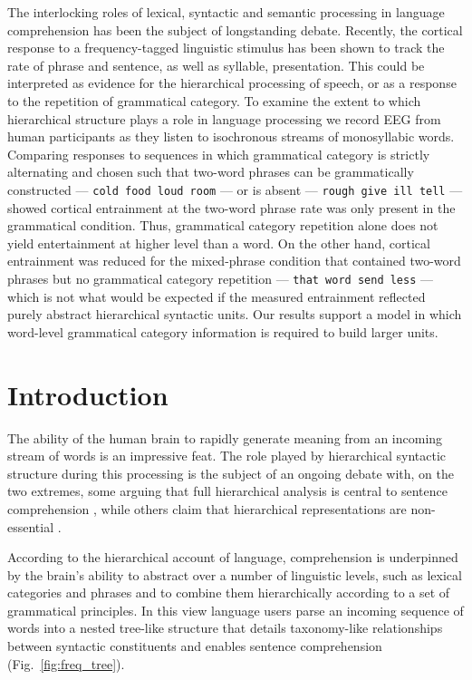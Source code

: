 \documentclass[10pt,letterpaper]{article}
\newcommand{\citet}[1]{\cite{#1}}
\begin{document}
The interlocking roles of lexical, syntactic and semantic processing
in language comprehension has been the subject of longstanding
debate. Recently, the cortical response to a frequency-tagged
linguistic stimulus has been shown to track the rate of phrase and
sentence, as well as syllable, presentation. This could be interpreted
as evidence for the hierarchical processing of speech, or as a
response to the repetition of grammatical category. To examine the
extent to which hierarchical structure plays a role in language
processing we record EEG from human participants as they listen to
isochronous streams of monosyllabic words. Comparing responses to
sequences in which grammatical category is strictly alternating and
chosen such that two-word phrases can be grammatically constructed ---
\texttt{cold food loud room} --- or is absent --- \texttt{rough give
  ill tell} --- showed cortical entrainment at the two-word phrase
rate was only present in the grammatical condition. Thus, grammatical
category repetition alone does not yield entertainment at higher level
than a word. On the other hand, cortical entrainment was reduced for
the mixed-phrase condition that contained two-word phrases but no
grammatical category repetition --- \texttt{that word send less} ---
which is not what would be expected if the measured entrainment
reflected purely abstract hierarchical syntactic units. Our results
support a model in which word-level grammatical category information
is required to build larger units.

\section*{Introduction}

The ability of the human brain to rapidly generate meaning from an
incoming stream of words is an impressive feat. The role played by
hierarchical syntactic structure during this processing is the subject
of an ongoing debate with, on the two extremes, some arguing that full
hierarchical analysis is central to sentence comprehension
\citet{Chomsky1995,BerwickEtAl2013, EveraertEtAl2015}, while others
claim that hierarchical representations are non-essential
\cite{FrankEtAl2012, FrankBod2011, FrankYang2018,
  FrankChristiansen2018}.

According to the hierarchical account of language, comprehension is
underpinned by the brain's ability to abstract over a number of
linguistic levels, such as lexical categories and phrases and to
combine them hierarchically according to a set of grammatical
principles. In this view language users parse an incoming sequence of
words into a nested tree-like structure that details taxonomy-like
relationships between syntactic constituents and enables sentence
comprehension (Fig.~\ref{fig:freq_tree}).
\end{document}
